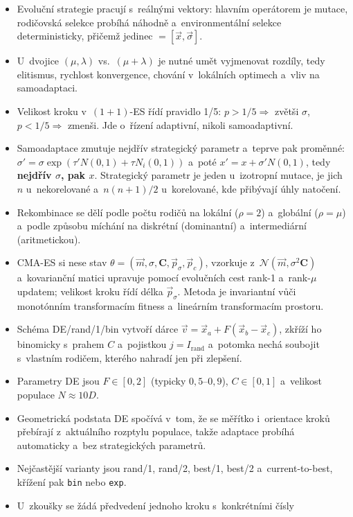 \documentclass[11pt,a4paper]{article}
\theoremstyle{definition}
\begin{document}
\begin{itemize}
\item Evoluční strategie pracují s~reálnými vektory: hlavním operátorem je mutace,
  rodičovská selekce probíhá náhodně a~environmentální selekce deterministicky,
  přičemž jedinec $= [\vec x, \vec\sigma]$.
\item U~dvojice $(\mu,\lambda)$ vs.\ $(\mu+\lambda)$ je nutné umět vyjmenovat rozdíly,
  tedy elitismus, rychlost konvergence, chování v~lokálních optimech a~vliv na samoadaptaci.
\item Velikost kroku v~$(1+1)$-ES řídí pravidlo 1/5: $p > 1/5 \Rightarrow$ zvětši $\sigma$,
  $p < 1/5 \Rightarrow$ zmenši. Jde o~řízení adaptivní, nikoli samoadaptivní.
\item Samoadaptace zmutuje nejdřív strategický parametr a~teprve pak proměnné:
  $\sigma' = \sigma \exp(\tau'N(0,1) + \tau N_i(0,1))$ a~poté $x' = x + \sigma' N(0,1)$,
  tedy \textbf{nejdřív $\sigma$, pak $x$}. Strategický parametr je jeden u~izotropní mutace,
  je jich $n$ u~nekorelované a~$n(n+1)/2$ u~korelované, kde přibývají úhly natočení.
\item Rekombinace se dělí podle počtu rodičů na lokální ($\rho=2$) a~globální ($\rho=\mu$)
  a~podle způsobu míchání na diskrétní (dominantní) a~intermediární (aritmetickou).
\item CMA-ES si nese stav $\theta = (\vec m,\sigma,\mathbf C,\vec p_\sigma,\vec p_c)$,
  vzorkuje z~$\mathcal N(\vec m, \sigma^2\mathbf C)$ a~kovarianční matici upravuje pomocí
  evolučních cest rank-1 a~rank-$\mu$ updatem; velikost kroku řídí délka $\vec p_\sigma$.
  Metoda je invariantní vůči monotónním transformacím fitness a~lineárním transformacím
  prostoru.
\item Schéma DE/rand/1/bin vytvoří dárce $\vec v = \vec x_a + F(\vec x_b - \vec x_c)$,
  zkříží ho binomicky s~prahem $C$ a~pojistkou $j = I_{\mathrm{rand}}$ a~potomka nechá
  soubojit s~vlastním rodičem, kterého nahradí jen při zlepšení.
\item Parametry DE jsou $F \in [0,2]$ (typicky $0{,}5$--$0{,}9$), $C \in [0,1]$
  a~velikost populace $N \approx 10D$.
\item Geometrická podstata DE spočívá v~tom, že se měřítko i~orientace kroků přebírají
  z~aktuálního rozptylu populace, takže adaptace probíhá automaticky a~bez strategických
  parametrů.
\item Nejčastější varianty jsou rand/1, rand/2, best/1, best/2 a~current-to-best,
  křížení pak \texttt{bin} nebo \texttt{exp}.
\item U~zkoušky se žádá předvedení jednoho kroku s~konkrétními čísly

\end{itemize}
\end{document}

